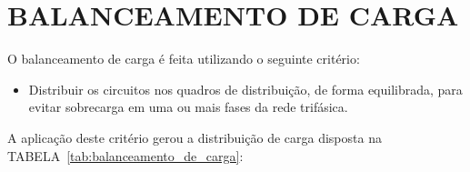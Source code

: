 \section{BALANCEAMENTO DE CARGA}

O balanceamento de carga é feita utilizando o seguinte critério:

\begin{itemize}
	
	\item Distribuir os circuitos nos quadros de distribuição, de forma equilibrada, para evitar sobrecarga em uma ou mais fases da rede trifásica.
	
\end{itemize}

A aplicação deste critério gerou a distribuição de carga disposta na TABELA~\ref{tab:balanceamento_de_carga}:

